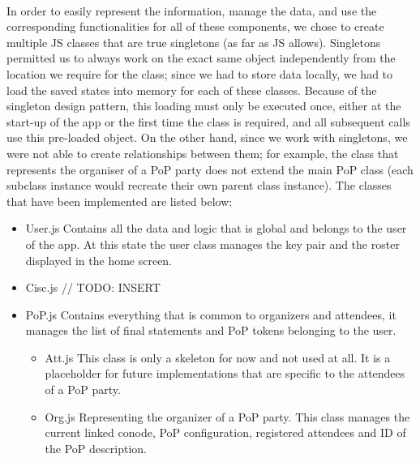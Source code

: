 \paragraph{}
In order to easily represent the information, manage the data, and use the corresponding functionalities for all of these components, we chose to create multiple JS classes that are true singletons (as far as JS allows). Singletons permitted us to always work on the exact same object independently from the location we require for the class; since we had to store data locally, we had to load the saved states into memory for each of these classes. Because of the singleton design pattern, this loading must only be executed once, either at the start-up of the app or the first time the class is required, and all subsequent calls use this pre-loaded object. On the other hand, since we work with singletons, we were not able to create relationships between them; for example, the class that represents the organiser of a PoP party does not extend the main PoP class (each subclass instance would recreate their own parent class instance). The classes that have been implemented are listed below:

\begin{itemize}
\item User.js \linebreak Contains all the data and logic that is global and belongs to the user of the app. At this state the user class manages the key pair and the roster displayed in the home screen.

\item Cisc.js // TODO: INSERT

\item PoP.js \linebreak Contains everything that is common to organizers and attendees, it manages the list of final statements and PoP tokens belonging to the user.
\begin{itemize}
\item Att.js \linebreak This class is only a skeleton for now and not used at all. It is a placeholder for future implementations that are specific to the attendees of a PoP party.

\item Org.js \linebreak Representing the organizer of a PoP party. This class manages the current linked conode, PoP configuration, registered attendees and ID of the PoP description.
\end{itemize}
\end{itemize}

